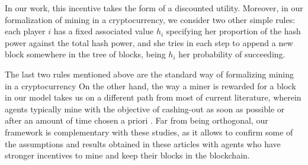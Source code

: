 %
In our work, this incentive takes the form of a discounted utility.
%
Moreover, in our formalization of mining in a cryptocurrency,
we consider two other simple rules: each player $i$ 
has a fixed associated value $h_i$ specifying her proportion of the hash power 
against the total hash power, and  
she tries in each step to append a new block somewhere in the tree of blocks, being 
$h_i$ her probability of succeeding. 

The last two rules mentioned above 
are the standard way of 
formalizing mining in a cryptocurrency 
On the other hand, the way a miner is rewarded for a block in our model
takes us on a different path from most of current literature, wherein agents typically mine 
with the objective of cashing-out as soon as possible or after an amount of time chosen a priori   \cite{mininggames:2016,biais2018blockchain}. Far from being orthogonal, our framework is complementary with these studies, as it allows to confirm some of the assumptions and results obtained in these articles with agents who have stronger incentives to mine and keep their blocks in the blockchain.


